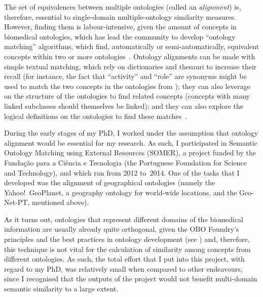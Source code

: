 The set of equivalences between multiple ontologies (called an \emph{alignment}) is, therefore, essential to single-domain multiple-ontology similarity measures. However, finding them is labour-intensive, given the amount of concepts in biomedical ontologies, which has lead the community to develop ``ontology matching'' algorithms, which find, automatically or semi-automatically, equivalent concepts within two or more ontologies~\citep{Euzenat2007}. Ontology alignments can be made with simple textual matching, which rely on dictionaries and thesauri to increase their recall (for instance, the fact that ``activity'' and ``role'' are synonyms might be used to match the two concepts in the ontologies from ); they can also leverage on the structure of the ontologies to find related concepts (concepts with many linked subclasses should themselves be linked); and they can also explore the logical definitions on the ontologies to find these matches~\citep{Shvaiko2005}.

During the early stages of my PhD, I worked under the assumption that ontology alignment would be essential for my research. As such, I participated in Semantic Ontology Matching using External Resources (SOMER), a project funded by the Fundação para a Ciência e Tecnologia (the Portuguese Foundation for Science and Technology), and which ran from 2012 to~2014. One of the tasks that I developed was the alignment of geographical ontologies (namely the Yahoo!~GeoPlanet, a geography ontology for world-wide locations, and the Geo-Net-PT, mentioned above).

As it turns out, ontologies that represent different domains of the biomedical information are usually already quite orthogonal, given the OBO Foundry's principles and the best practices in ontology development (see ) and, therefore, this technique is not vital for the calculation of similarity among concepts from different ontologies. As such, the total effort that I put into this project, with regard to my PhD, was relatively small when compared to other endeavours, since I recognised that the outputs of the project would not benefit multi-domain semantic similarity to a large extent.

